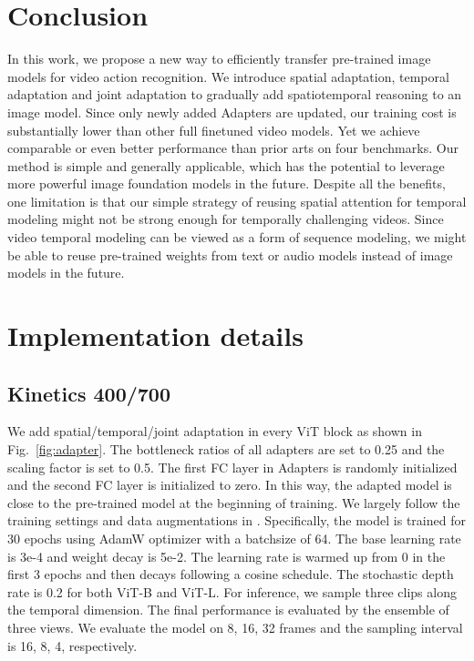 \documentclass{article} \usepackage{iclr2023_conference,times}
\begin{document}
	\section{Conclusion}
	\vspace{-2ex}
	In this work, we propose a new way to efficiently transfer pre-trained image models for video action recognition. 
We introduce spatial adaptation, temporal adaptation and joint adaptation to gradually add spatiotemporal reasoning to an image model.
Since only newly added Adapters are updated, our training cost is substantially lower than other full finetuned video models. 
	Yet we achieve comparable or even better performance than prior arts on four benchmarks. 
	Our method is simple and generally applicable, which has the potential to leverage more powerful image foundation models in the future. 
Despite all the benefits, one limitation is that our simple strategy of reusing spatial attention for temporal modeling might not be strong enough for temporally challenging videos.
	Since video temporal modeling can be viewed as a form of sequence modeling, we might be able to reuse pre-trained weights from text or audio models instead of image models in the future. 


	
	
	




	
	


	
	
	
	
	\appendix
	


	\section{Implementation details}
	\label{app:implementation}
	\subsection{Kinetics 400/700}
	We add spatial/temporal/joint adaptation in every ViT block as shown in Fig.\ \ref{fig:adapter}. The bottleneck ratios of all adapters are set to 0.25 and the scaling factor is set to 0.5. The first FC layer in Adapters is randomly initialized and the second FC layer is initialized to zero. In this way, the adapted model is close to the pre-trained model at the beginning of training. We largely follow the training settings and data augmentations in \citet{liu2022videoswin}. Specifically, the model is trained for 30 epochs using AdamW \citep{kingma2014adam} optimizer with a batchsize of 64. The base learning rate is 3e-4 and weight decay is 5e-2. The learning rate is warmed up from 0 in the first 3 epochs and then decays following a cosine schedule. The stochastic depth rate is 0.2 for both ViT-B and ViT-L. For inference, we sample three clips along the temporal dimension. The final performance is evaluated by the ensemble of three views. We evaluate the model on 8, 16, 32 frames and the sampling interval is 16, 8, 4, respectively.
	
\end{document}
